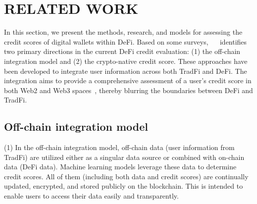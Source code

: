 \documentclass[../ICIT-Paper-2024.tex]{subfiles}
\begin{document}
\section{RELATED WORK}\label{section2}

In this section, we present the methods, research, and models for assessing the credit scores of digital wallets within DeFi. Based on some surveys, 
~\citeauthor{packin2023decentralized}~\cite{packin2023decentralized} identifies two primary directions in the current DeFi credit evaluation: (1) the off-chain integration model and (2) the crypto-native credit score. These approaches have been developed to integrate user information across both TradFi and DeFi. The integration aims to provide a comprehensive assessment of a user's credit score in both Web2 and Web3 spaces~\cite{voshmgir2020token}, thereby blurring the boundaries between DeFi and TradFi.



\subsection{Off-chain integration model}
(1) In the off-chain integration model, off-chain data (user information from TradFi) are utilized either as a singular data source or combined with on-chain data (DeFi data). Machine learning models 
leverage these data to determine credit scores. All of them (including both data and credit scores) are continually updated, encrypted, and stored publicly on the blockchain. This is intended to enable users to access their data easily and transparently.
\end{document}
